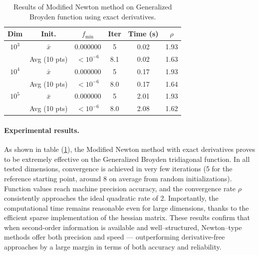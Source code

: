 \documentclass[a4paper,12pt]{article}
\begin{document}
	\begin{table}[H]%
		\centering
		\renewcommand{\arraystretch}{1.2}
		\begin{tabular}{|c|c|c|c|c|c|}
			\hline
			\textbf{Dim} & \textbf{Init.} & \textbf{$f_{\min}$} & \textbf{Iter} & \textbf{Time (s)} & \textbf{$\rho$} \\
			\hline
			$10^3$   & $\bar{x}$       & $0.000000$  & 5   & 0.02 & 1.93 \\
			& Avg (10 pts)    & $<10^{-6}$  & 8.1 & 0.02 & 1.63 \\
			\hline
			$10^4$   & $\bar{x}$       & $0.000000$  & 5   & 0.17 & 1.93 \\
			& Avg (10 pts)    & $<10^{-6}$  & 8.0 & 0.17 & 1.64 \\
			\hline
			$10^5$   & $\bar{x}$       & $0.000000$  & 5   & 2.01 & 1.93 \\
			& Avg (10 pts)    & $<10^{-6}$  & 8.0 & 2.08 & 1.62 \\
			\hline
		\end{tabular}
		\label{tab:gb_exact_al}
		\caption{Results of Modified Newton method on Generalized Broyden function using exact derivatives.}
	\end{table}
	
	\paragraph{Experimental results.}
	As shown in table (\ref{tab:gb_exact_al}), the Modified Newton method with exact derivatives proves to be extremely effective on the Generalized Broyden tridiagonal function. In all tested dimensions, convergence is achieved in very few iterations (5 for the reference starting point, around 8 on average from random initializations). Function values reach machine precision accuracy, and the convergence rate \(\rho\) consistently approaches the ideal quadratic rate of 2. Importantly, the computational time remains reasonable even for large dimensions, thanks to the efficient sparse implementation of the hessian matrix. These results confirm that when second-order information is available and well--structured, Newton--type methods offer both precision and speed — outperforming derivative-free approaches by a large margin in terms of both accuracy and reliability.
	
\end{document}
